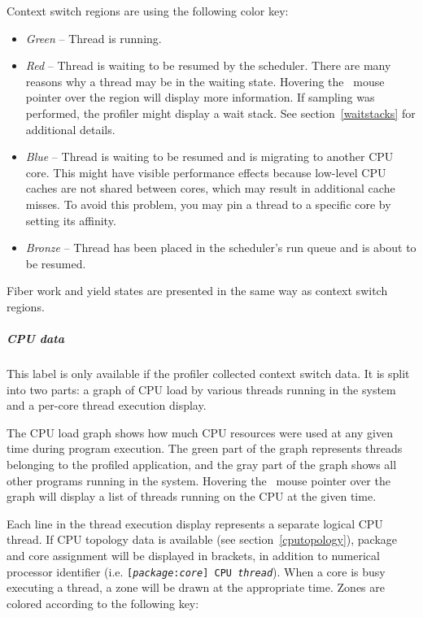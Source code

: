 \documentclass[hidelinks,titlepage,a4paper,twoside]{article}
\begin{document}
Context switch regions are using the following color key:

\begin{itemize}
\item \emph{Green} -- Thread is running.
\item \emph{Red} -- Thread is waiting to be resumed by the scheduler. There are many reasons why a thread may be in the waiting state. Hovering the \faMousePointer{}~mouse pointer over the region will display more information. If sampling was performed, the profiler might display a wait stack. See section~\ref{waitstacks} for additional details.
\item \emph{Blue} -- Thread is waiting to be resumed and is migrating to another CPU core. This might have visible performance effects because low-level CPU caches are not shared between cores, which may result in additional cache misses. To avoid this problem, you may pin a thread to a specific core by setting its affinity.
\item \emph{Bronze} -- Thread has been placed in the scheduler's run queue and is about to be resumed.
\end{itemize}

Fiber work and yield states are presented in the same way as context switch regions.

\subparagraph{CPU data}

This label is only available if the profiler collected context switch data. It is split into two parts: a graph of CPU load by various threads running in the system and a per-core thread execution display.

The CPU load graph shows how much CPU resources were used at any given time during program execution. The green part of the graph represents threads belonging to the profiled application, and the gray part of the graph shows all other programs running in the system. Hovering the \faMousePointer{}~mouse pointer over the graph will display a list of threads running on the CPU at the given time.

Each line in the thread execution display represents a separate logical CPU thread. If CPU topology data is available (see section~\ref{cputopology}), package and core assignment will be displayed in brackets, in addition to numerical processor identifier (i.e. \texttt{[\emph{package}:\emph{core}] CPU \emph{thread}}). When a core is busy executing a thread, a zone will be drawn at the appropriate time. Zones are colored according to the following key:
\end{document}
